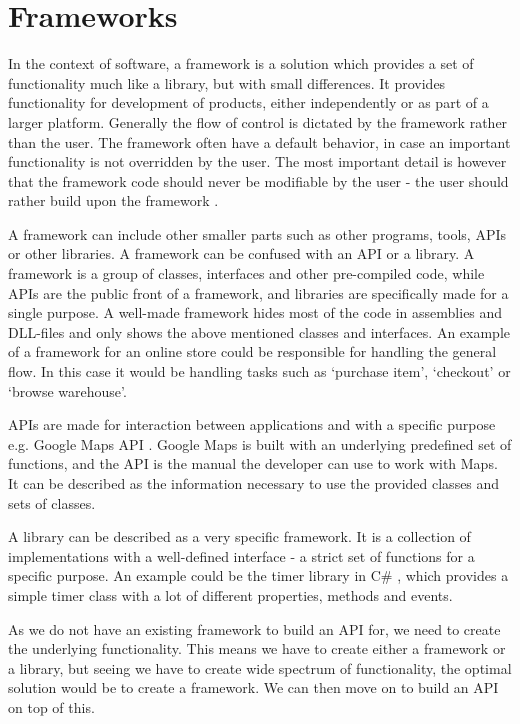 \section{Frameworks}

In the context of software, a framework is a solution which provides a set of functionality much like a library, but with small differences. It provides functionality for development of products, either independently or as part of a larger platform.
Generally the flow of control is dictated by the framework rather than the user. The framework often have a default behavior, in case an important functionality is not overridden by the user. The most important detail is however that the framework code should never be modifiable by the user - the user should rather build upon the framework \cite{framework}.

A framework can include other smaller parts such as other programs, tools, APIs or other libraries. A framework can be confused with an API or a library. A framework is a group of classes, interfaces and other pre-compiled code, while APIs are the public front of a framework, and libraries are specifically made for a single purpose. A well-made framework hides most of the code in assemblies and DLL-files and only shows the above mentioned classes and interfaces. An example of a framework for an online store could be responsible for handling the general flow. In this case it would be handling tasks such as `purchase item', `checkout' or `browse warehouse'.

APIs are made for interaction between applications and with a specific purpose e.g. Google Maps API \cite{google-maps-api}. Google Maps is built with an underlying predefined set of functions, and the API is the manual the developer can use to work with Maps. It can be described as the information necessary to use the provided classes and sets of classes.

A library can be described as a very specific framework. It is a collection of implementations with a well-defined interface - a strict set of functions for a specific purpose. An example could be the timer library in C\# \cite{net-timer}, which provides a simple timer class with a lot of different properties, methods and events.

As we do not have an existing framework to build an API for, we need to create the underlying functionality. This means we have to create either a framework or a library, but seeing we have to create wide spectrum of functionality, the optimal solution would be to create a framework. We can then move on to build an API on top of this.